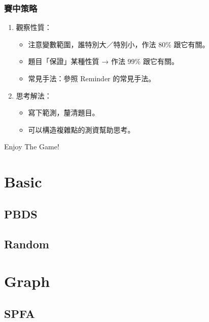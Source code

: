 \documentclass[twocolumn]{article}
\begin{document}
\subsubsection{賽中策略}
\begin{enumerate}
    
    \item 觀察性質：
    \begin{itemize}
        \item 注意變數範圍，誰特別大／特別小，作法 80\% 跟它有關。
        \item 題目「保證」某種性質 → 作法 99\% 跟它有關。
        \item 常見手法：參照 Reminder 的常見手法。
    \end{itemize}
    
    \item 思考解法：
    \begin{itemize}
        \item 寫下範測，釐清題目。
        \item 可以構造複雜點的測資幫助思考。
    \end{itemize}
\end{enumerate}

\vspace{3pt}

\begin{center}
    {\Huge Enjoy The Game!}
\end{center}

\newpage

\section{Basic}

\subsection{PBDS}


\subsection{Random}


\section{Graph}

\subsection{SPFA}

\end{document}
